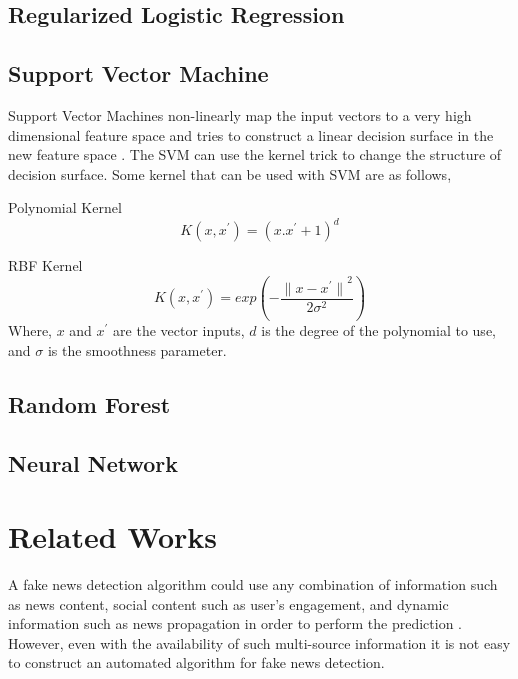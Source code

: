 \subsection{Regularized Logistic Regression}

\subsection{Support Vector Machine}
Support Vector Machines non-linearly map the input vectors to a very high dimensional feature space and tries to construct a linear decision surface in the new feature space \cite{cortes1995support}. The SVM can use the kernel trick to change the structure of decision surface\cite{cortes1995support}. Some kernel that can be used with SVM are as follows,

Polynomial Kernel
\begin{equation}
    \label{eq:polynomial_kernel}
    K(x, x^{'}) = {(x.x^{'} + 1)}^{d}
\end{equation}

RBF Kernel
\begin{equation}
    \label{eq:rbf_kernel}
    K(x, x^{'}) = exp(- \frac{{\lVert x - x^{'} \rVert}^{2}}{2 \sigma^{2}})
\end{equation}
Where, $x$ and $x^{'}$ are the vector inputs, $d$ is the degree of the polynomial to use, and $\sigma$ is the smoothness parameter.
\subsection{Random Forest}
\subsection{Neural Network}

\section{Related Works} \label{related_works}
A fake news detection algorithm could use any combination of information such as news content, social content such as user's engagement, and dynamic information such as news propagation in order to perform the prediction \cite{shu2018fakenewsnet}. However, even with the availability of such multi-source information it is not easy to construct an automated algorithm for fake news detection\cite{shu2017fake}.

